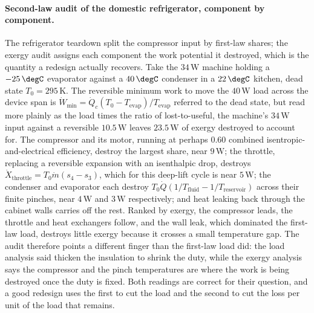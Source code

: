 \paragraph{Second-law audit of the domestic refrigerator, component by component.}
The refrigerator teardown split the compressor input by first-law shares; the
exergy audit assigns each component the work potential it destroyed, which is the
quantity a redesign actually recovers. Take the $34\,\text{W}$ machine holding a
$-25\,\degC$ evaporator against a $40\,\degC$ condenser in a $22\,\degC$ kitchen,
dead state $T_0 = 295\,\si{\kelvin}$. The reversible minimum work to move the
$40\,\text{W}$ load across the device span is $\dot W_{\min} = \dot Q_c
(T_0 - T_{\text{evap}})/T_{\text{evap}}$ referred to the dead state, but read more
plainly as the load times the ratio of lost-to-useful, the machine's $34\,\text{W}$
input against a reversible $10.5\,\text{W}$ leaves $23.5\,\text{W}$ of exergy
destroyed to account for. The compressor and its motor, running at perhaps
$0.60$ combined isentropic-and-electrical efficiency, destroy the largest share,
near $9\,\text{W}$; the throttle, replacing a reversible expansion with an
isenthalpic drop, destroys $\dot X_{\text{throttle}} = T_0 \dot m (s_4 - s_3)$,
which for this deep-lift cycle is near $5\,\text{W}$; the condenser and evaporator
each destroy $T_0 \dot Q (1/T_{\text{fluid}} - 1/T_{\text{reservoir}})$ across
their finite pinches, near $4\,\text{W}$ and $3\,\text{W}$ respectively; and heat
leaking back through the cabinet walls carries off the rest. Ranked by exergy, the
compressor leads, the throttle and heat exchangers follow, and the wall leak,
which dominated the first-law load, destroys little exergy because it crosses a
small temperature gap. The audit therefore points a different finger than the
first-law load did: the load analysis said thicken the insulation to shrink the
duty, while the exergy analysis says the compressor and the pinch temperatures are
where the work is being destroyed once the duty is fixed. Both readings are
correct for their question, and a good redesign uses the first to cut the load and
the second to cut the loss per unit of the load that remains.

